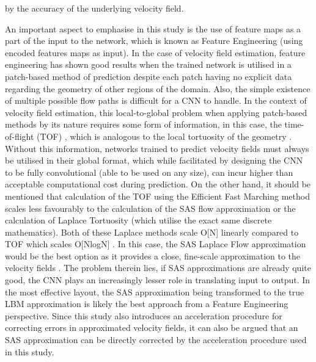 \documentclass{article}
\begin{document}
by the accuracy of the underlying velocity field.

An important aspect to emphasise in this study is the use of feature maps as a part of the input to the network, which is known as Feature Engineering (using encoded features maps as input). In the case of velocity field estimation, feature engineering has shown good results when the trained network is utilised in a patch-based method of prediction \cite{poreflownet} despite each patch having no explicit data regarding the geometry of other regions of the domain. Also, the simple existence of multiple possible flow paths is difficult for a CNN to handle. In the context of velocity field estimation, this local-to-global problem when applying patch-based methods by its nature requires some form of information, in this case, the time-of-flight (TOF) \cite{tof}, which is analogous to the local tortuosity of the geometry \cite{tortuosity}. Without this information, networks trained to predict velocity fields must always be utilised in their global format, which while facilitated by designing the CNN to be fully convolutional (able to be used on any size), can incur higher than acceptable computational cost during prediction. On the other hand, it should be mentioned that calculation of the TOF using the Efficient Fast Marching method scales less favourably to the calculation of the SAS flow approximation or the calculation of Laplace Tortuosity (which utilise the exact same discrete mathematics). Both of these Laplace methods scale O[N] linearly \cite{pfvs,tortuosity} compared to TOF which scales O[NlogN] \cite{tof}. In this case, the SAS Laplace Flow approximation would be the best option as it provides a close, fine-scale approximation to the velocity fields \cite{shabro2012finite,pfvs}. The problem therein lies, if SAS approximations are already quite good, the CNN plays an increasingly lesser role in translating input to output. In the most effective layout, the SAS approximation being transformed to the true LBM approximation is likely the best approach from a Feature Engineering perspective. Since this study also introduces an acceleration procedure for correcting errors in approximated velocity fields, it can also be argued that an SAS approximation can be directly corrected by the acceleration procedure used in this study. 
\end{document}
